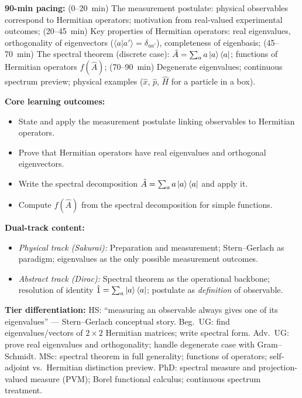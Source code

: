 \documentclass[11pt,a4paper]{article}
\begin{document}
\medskip

\begin{tcolorbox}[modulebox, title={Module~I.1 --- Lecture L03: Observables, Hermitian Operators, and the Spectral Theorem}]
\textbf{90-min pacing:} (0--20~min) The measurement postulate: physical observables correspond to Hermitian operators;
motivation from real-valued experimental outcomes;
(20--45~min) Key properties of Hermitian operators: real eigenvalues, orthogonality of eigenvectors
($\langle a|a'\rangle = \delta_{aa'}$), completeness of eigenbasis;
(45--70~min) The spectral theorem (discrete case): $\hat{A} = \sum_a a\ket{a}\bra{a}$;
functions of Hermitian operators $f(\hat{A})$;
(70--90~min) Degenerate eigenvalues; continuous spectrum preview; physical examples
($\hat{x}$, $\hat{p}$, $\hat{H}$ for a particle in a box).

\medskip\textbf{Core learning outcomes:}
\begin{itemize}[leftmargin=1.4em,topsep=2pt,itemsep=1pt]
  \item State and apply the measurement postulate linking observables to Hermitian operators.
  \item Prove that Hermitian operators have real eigenvalues and orthogonal eigenvectors.
  \item Write the spectral decomposition $\hat{A}=\sum_a a\ket{a}\bra{a}$ and apply it.
  \item Compute $f(\hat{A})$ from the spectral decomposition for simple functions.
\end{itemize}

\medskip\textbf{Dual-track content:}
\begin{itemize}[leftmargin=1.4em,topsep=2pt,itemsep=1pt]
  \item \textit{Physical track (Sakurai):} Preparation and measurement; Stern--Gerlach as paradigm;
    eigenvalues as the only possible measurement outcomes.
  \item \textit{Abstract track (Dirac):} Spectral theorem as the operational backbone; resolution of
    identity $\hat{1}=\sum_a\ket{a}\bra{a}$; postulate as \emph{definition} of observable.
\end{itemize}

\medskip\textbf{Tier differentiation:}
HS: ``measuring an observable always gives one of its eigenvalues'' --- Stern--Gerlach conceptual story.
Beg.\ UG: find eigenvalues/vectors of $2\times 2$ Hermitian matrices; write spectral form.
Adv.\ UG: prove real eigenvalues and orthogonality; handle degenerate case with Gram--Schmidt.
MSc: spectral theorem in full generality; functions of operators; self-adjoint vs.\ Hermitian distinction preview.
PhD: spectral measure and projection-valued measure (PVM); Borel functional calculus; continuous spectrum treatment.


\end{tcolorbox}
\end{document}
